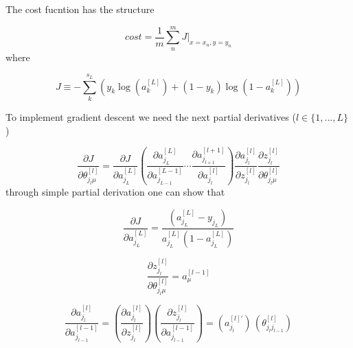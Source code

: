 \documentclass[a4paper,11pt]{article}
\newcommand{\na}[2]{a_{#1}^{[#2]}}
\newcommand{\nz}[2]{z_{#1}^{[#2]}}
\newcommand{\nt}[3]{\theta_{#1 #2}^{[#3]}}
\newcommand{\ff}[2]{#1 \left(#2 \right)}
\begin{document}
The cost fucntion has the structure

\begin{equation}
    cost=\frac1m \sum^m_n 
    J \Big\vert_{x=x_n,y=y_n}  %
\end{equation}
where

\begin{equation}
    J\equiv -\sum^{s_L}_k
    \left(
        y_k\ff{\log}{\na{k}{L}}  %
        +(1-y_k)\ff{\log}{1-\na{k}{L}} 
    \right)
\end{equation}

To implement gradient descent we need 
the next partial derivatives ($l\in\{1,...,L\} $)

\begin{equation}
    \frac{\partial J }{\partial  \nt{j_l}{\mu}{l}  } 
   =\frac{\partial J  }{\partial \na{j_L}{L}  }
    \left(
    \frac{\partial \na{j_L}{L}  }{\partial \na{j_{L-1}}{L-1}  }
    \cdots
    \frac{\partial \na{j_{l+1}}{l+1}   }{\partial \na{j_l}{l}   }
    \right)
    \frac{\partial \na{j_l}{l}   }{\partial \nz{j_l}{l}   }
    \frac{\partial \nz{j_l}{l} }
        {\partial \nt{j_l}{\mu}{l}  }
\end{equation}
through simple partial derivation one can show that 

\begin{equation}
    \frac{\partial J  }{\partial \na{j_L}{L}  }
    = \frac{(\na{j_L}{L} -y_{j_L})}{\na{j_L}{L} (1-\na{j_L}{L} )} 
\end{equation}


\begin{equation}
  \frac{\partial \nz{j_l}{l}  }
        {\partial \nt{j_l}{\mu}{l}  }
        =  \na{\mu}{l-1}
\end{equation}

\begin{equation}
    \frac{\partial \na{j_l}{l}  }
    {\partial \na{j_{l-1}}{l-1}  }
    =
   \left( \frac{\partial \na{j_l}{l}}   {\partial \nz{j_{l}}{l}  }\right)
   \left( \frac{\partial \nz{j_{l}}{l} }   {\partial \na{j_{l-1}}{l-1}  }\right)
    = \left( a^{[l]'}_{j_{l} }\right)
    \, \left( \nt{j_l}{j_{l-1}}{l} \right)
\end{equation}
\end{document}
